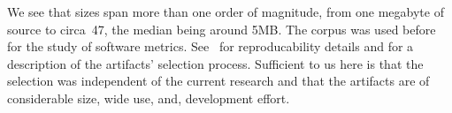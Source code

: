 We see that sizes span more than one order of magnitude, from one megabyte of
source to circa~47, the median being around 5MB. The corpus was used before for 
the study of software metrics. See~\cite{Matteo:Cite:Gal:TwoPapers} for
reproducability details and for a description of the artifacts' selection
process.  Sufficient to us here is that the selection was independent of the
current research and that the artifacts are of considerable size, wide
use, and, development effort.
